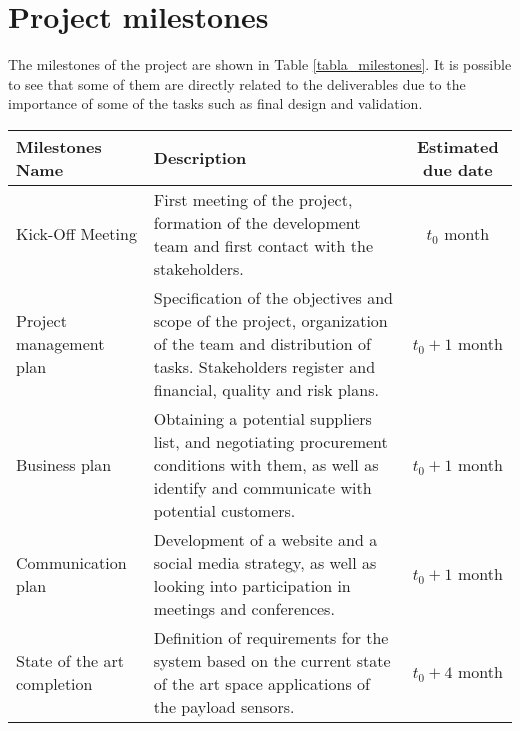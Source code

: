 \clearpage
\section{Project milestones}
The milestones of the project are shown in Table \ref{tabla_milestones}. It is possible to see that some of them are directly related to the deliverables due to the importance of some of the tasks such as final design and validation.
\begin{longtable}[H]{>{\raggedright\arraybackslash}p{4cm} p{8cm} c}
	
	\toprule[2pt]
	
	\textbf{Milestones Name} &  \textbf{Description} & \textbf{Estimated due date} \\
	
	\midrule [1.5pt]
	\endhead
	
	Kick-Off Meeting & First meeting of the project, formation of the development team and first contact with the stakeholders.& $t_0$ month\vspace{0.2cm} \\
	
	\midrule
	
	Project management plan & Specification of the objectives and scope of the project, organization of the team and distribution of tasks. Stakeholders register and financial, quality and risk plans.& $t_0 + 1$ month\vspace{0.2cm} \\
	
	\midrule
	
	Business plan & Obtaining a potential suppliers list, and negotiating procurement conditions with them, as well as identify and communicate with potential customers.& $t_0 + 1$ month\vspace{0.2cm} \\
	
	\midrule
	
	Communication plan & Development of a website and a social media strategy, as well as looking into participation in meetings and conferences.& $t_0 + 1$ month\vspace{0.2cm} \\
	
	\midrule
	
	State of the art completion & Definition of requirements for the system based on the current state of the art space applications of the payload sensors.& $t_0 + 4$ month\vspace{0.2cm} \\
	

\end{longtable}
